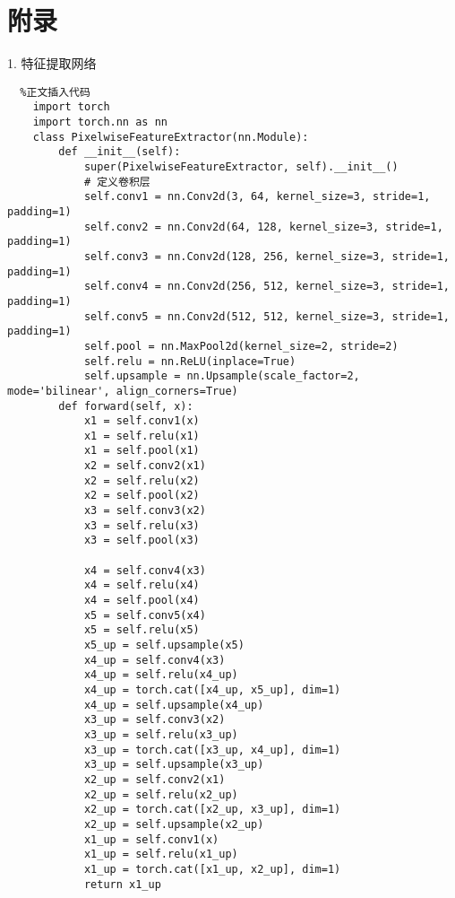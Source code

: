 \chapter{附录}
1. 特征提取网络
\begin{lstlisting}	%正文插入代码
    import torch
    import torch.nn as nn
    class PixelwiseFeatureExtractor(nn.Module):
        def __init__(self):
            super(PixelwiseFeatureExtractor, self).__init__()
            # 定义卷积层
            self.conv1 = nn.Conv2d(3, 64, kernel_size=3, stride=1, padding=1)
            self.conv2 = nn.Conv2d(64, 128, kernel_size=3, stride=1, padding=1)
            self.conv3 = nn.Conv2d(128, 256, kernel_size=3, stride=1, padding=1)
            self.conv4 = nn.Conv2d(256, 512, kernel_size=3, stride=1, padding=1)
            self.conv5 = nn.Conv2d(512, 512, kernel_size=3, stride=1, padding=1)
            self.pool = nn.MaxPool2d(kernel_size=2, stride=2)
            self.relu = nn.ReLU(inplace=True)
            self.upsample = nn.Upsample(scale_factor=2, mode='bilinear', align_corners=True)   
        def forward(self, x):
            x1 = self.conv1(x)
            x1 = self.relu(x1)
            x1 = self.pool(x1)
            x2 = self.conv2(x1)
            x2 = self.relu(x2)
            x2 = self.pool(x2)
            x3 = self.conv3(x2)
            x3 = self.relu(x3)
            x3 = self.pool(x3)
            
            x4 = self.conv4(x3)
            x4 = self.relu(x4)
            x4 = self.pool(x4)
            x5 = self.conv5(x4)
            x5 = self.relu(x5)
            x5_up = self.upsample(x5)
            x4_up = self.conv4(x3)
            x4_up = self.relu(x4_up)
            x4_up = torch.cat([x4_up, x5_up], dim=1)
            x4_up = self.upsample(x4_up)
            x3_up = self.conv3(x2)
            x3_up = self.relu(x3_up)
            x3_up = torch.cat([x3_up, x4_up], dim=1)
            x3_up = self.upsample(x3_up)
            x2_up = self.conv2(x1)
            x2_up = self.relu(x2_up)
            x2_up = torch.cat([x2_up, x3_up], dim=1)
            x2_up = self.upsample(x2_up)
            x1_up = self.conv1(x)
            x1_up = self.relu(x1_up)
            x1_up = torch.cat([x1_up, x2_up], dim=1)
            return x1_up
\end{lstlisting}

